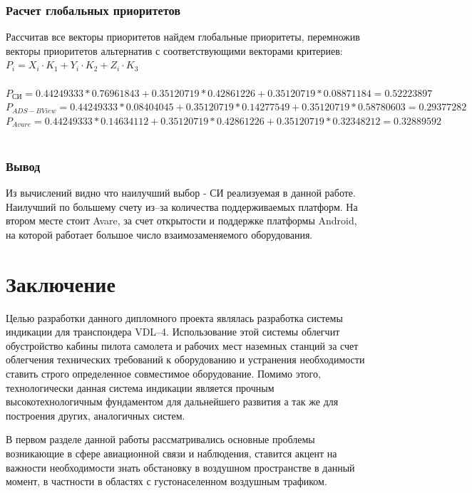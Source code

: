 \documentclass[a4paper,12pt]{report} %
\begin{document}
\subsection{Расчет глобальных приоритетов}

Рассчитав все векторы приоритетов найдем глобальные приоритеты, перемножив
векторы приоритетов альтернатив с соответствующими векторами критериев:\\

$P_i=X_i \cdot K_1 + Y_i \cdot K_2 + Z_i \cdot K_3 $ \\
\\
$P_{СИ} = 0.44249333 * 0.76961843 + 0.35120719 * 0.42861226 + 0.35120719 *
0.08871184 = 0.52223897$ \\
$P_{ADS-B View} = 0.44249333 * 0.08404045 + 0.35120719 * 0.14277549 + 0.35120719
* 0.58780603 = 0.29377282 $ \\
$P_{Avare} = 0.44249333 * 0.14634112 + 0.35120719 * 0.42861226 + 0.35120719 *
0.32348212 = 0.32889592$ \\
\\
\subsection{Вывод}

Из вычислений видно что наилучший выбор - СИ реализуемая в данной работе.
Наилучший по большему счету из--за количества поддерживаемых платформ. На втором
месте стоит Avare, за счет открытости и поддержке платформы Android, на которой
работает большое число взаимозаменяемого оборудования.

\newpage
\chapter*{Заключение}

Целью разработки данного дипломного проекта являлась разработка системы индикации
для транспондера VDL--4. Использование этой системы облегчит обустройство кабины
пилота самолета и рабочих мест наземных станций за счет облегчения технических
требований к оборудованию и устранения необходимости ставить строго определенное
совместимое оборудование. Помимо этого, технологически данная система индикации
является прочным высокотехнологичным фундаментом для дальнейшего развития а так
же для построения других, аналогичных систем.

В первом разделе данной работы рассматривались основные проблемы возникающие в
сфере авиационной связи и наблюдения, ставится акцент на важности необходимости
знать обстановку в воздушном пространстве в данный момент, в частности в
областях с густонаселенном воздушным трафиком.
\end{document}
